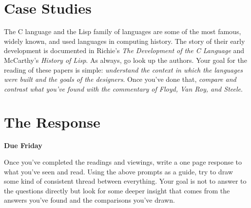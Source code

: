 \documentclass[10pt]{article}
\begin{document}
\section{Case Studies}

The C language and the Lisp family of languages are some of the most famous, widely known, and used languages in computing history.  The story of their early development is documented in Richie's \textit{The Development of the C Language} and McCarthy's \textit{History of Lisp}.  As always, go look up the authors.  Your goal for the reading of these papers is simple: \textit{understand the context in which the languages were built and the goals of the designers}. Once you've done that, \textit{compare and contrast what you've found with the commentary of Floyd, Van Roy, and Steele}.  

\section{The Response}

\begin{center}
\textbf{Due Friday }
\end{center}

Once you've completed the readings and viewings, write a one page response to what you've seen and read.  Using the above prompts as a guide, try to draw some kind of consistent thread between everything.  Your goal is not to answer to the questions directly but look for some deeper insight that comes from the answers you've found and the comparisons you've drawn.
\end{document}
